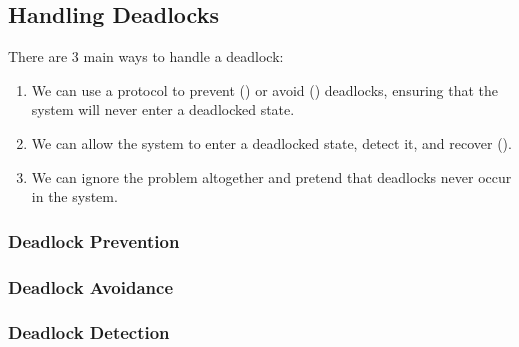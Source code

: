\subsection{Handling Deadlocks}\label{subsec:Handling_Deadlocks}
There are 3 main ways to handle a deadlock:
\begin{enumerate}[noitemsep]
\item We can use a protocol to prevent () or avoid () deadlocks, ensuring that the system will never enter a deadlocked state.
\item We can allow the system to enter a deadlocked state, detect it, and recover ().
\item We can ignore the problem altogether and pretend that deadlocks never occur in the system.
\end{enumerate}

\subsubsection{Deadlock Prevention}\label{subsubsec:Deadlock_Prevention}
\subsubsection{Deadlock Avoidance}\label{subsubsec:Deadlock_Avoidance}
\subsubsection{Deadlock Detection}\label{subsubsec:Deadlock_Detection}

